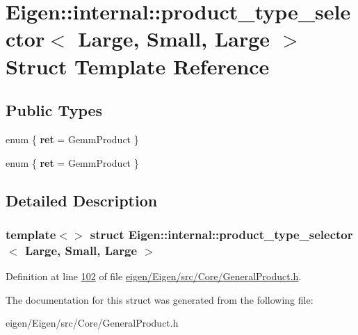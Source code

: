 \hypertarget{struct_eigen_1_1internal_1_1product__type__selector_3_01_large_00_01_small_00_01_large_01_4}{}\section{Eigen\+:\+:internal\+:\+:product\+\_\+type\+\_\+selector$<$ Large, Small, Large $>$ Struct Template Reference}
\label{struct_eigen_1_1internal_1_1product__type__selector_3_01_large_00_01_small_00_01_large_01_4}
\subsection*{Public Types}
\begin{DoxyCompactItemize}
\item 
\mbox{\label{struct_eigen_1_1internal_1_1product__type__selector_3_01_large_00_01_small_00_01_large_01_4_af90b6118200a3bd24ca9de4feb5d2c3c}} 
enum \{ {\bfseries ret} = Gemm\+Product
 \}
\item 
\mbox{\label{struct_eigen_1_1internal_1_1product__type__selector_3_01_large_00_01_small_00_01_large_01_4_a0c134123f28fc62183c1058ec0c6033e}} 
enum \{ {\bfseries ret} = Gemm\+Product
 \}
\end{DoxyCompactItemize}


\subsection{Detailed Description}
\subsubsection*{template$<$$>$\newline
struct Eigen\+::internal\+::product\+\_\+type\+\_\+selector$<$ Large, Small, Large $>$}



Definition at line \hyperlink{eigen_2_eigen_2src_2_core_2_general_product_8h_source_l00102}{102} of file \hyperlink{eigen_2_eigen_2src_2_core_2_general_product_8h_source}{eigen/\+Eigen/src/\+Core/\+General\+Product.\+h}.



The documentation for this struct was generated from the following file\+:\begin{DoxyCompactItemize}
\item 
eigen/\+Eigen/src/\+Core/\+General\+Product.\+h\end{DoxyCompactItemize}
